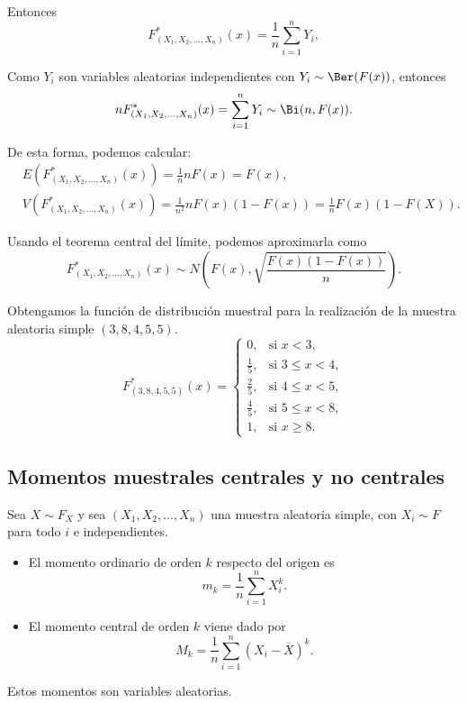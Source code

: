 Entonces
$$F_{(X_1, X_2, \dots, X_n)}^\ast(x) = \frac{1}{n}\sum_{i=1}^{n}{Y_i},$$

Como $Y_i$ son variables aleatorias independientes con $Y_i \sim \Ber(F(x))$, entonces
$$nF_{(X_1, X_2, \dots, X_n)}^\ast(x) = \sum_{i=1}^{n}{Y_i} \sim \Bi(n, F(x)).$$

De esta forma, podemos calcular:
\begin{align*}
     & E(F_{(X_1, X_2, \dots, X_n)}^\ast(x)) = \frac{1}{n}nF(x) = F(x),                                  \\
     & V(F_{(X_1, X_2, \dots, X_n)}^\ast(x)) = \frac{1}{n^2}nF(x)(1 - F(x)) = \frac{1}{n}F(x)(1 - F(X)).
\end{align*}

Usando el teorema central del límite, podemos aproximarla como
$$F_{(X_1, X_2, \dots, X_n)}^\ast(x) \sim N\left( F(x), \sqrt{\frac{F(x)(1 - F(x))}{n}}\right).$$

\begin{example}
    Obtengamos la función de distribución muestral para la realización de la muestra aleatoria simple $(3, 8, 4, 5, 5)$.
    $$F_{(3, 8, 4, 5, 5)}^\ast(x) = \begin{cases}
            0,           & \text{si } x < 3,        \\
            \frac{1}{5}, & \text{si } 3 \leq x < 4, \\
            \frac{2}{5}, & \text{si } 4 \leq x < 5, \\
            \frac{4}{5}, & \text{si } 5 \leq x < 8, \\
            1,           & \text{si } x \geq 8.
        \end{cases}$$
\end{example}

\subsection{Momentos muestrales centrales y no centrales}
Sea $X \sim F_X$ y sea $(X_1, X_2, \dots, X_n)$ una muestra aleatoria simple, con $X_i \sim F$ para todo $i$ e independientes.

\begin{itemize}
    \item El momento ordinario de orden $k$ respecto del origen es
          $$m_k = \frac{1}{n} \sum_{i=1}^{n}{X_i^k}.$$

    \item El momento central de orden $k$ viene dado por
          $$M_k = \frac{1}{n} \sum_{i=1}^{n} (X_i - \overline{X})^k.$$
\end{itemize}

\begin{note}
    Estos momentos son variables aleatorias.
\end{note}